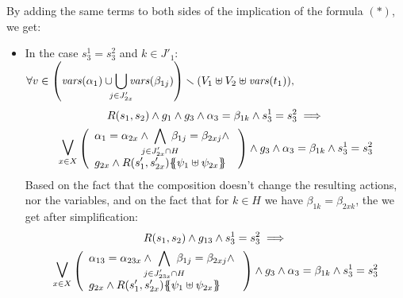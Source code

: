 \documentclass[runningheads]{llncs}
\begin{document}
\begin{enumerate}
\smallskip

By adding the same terms to both sides of the implication of the  formula $(*)$, we get:

\begin{itemize}
\item In the case $ s^1_3=s^2_3$ and $k \in J'_1$:\\
$\displaystyle {\forall v \in {\left(\mathit{vars}{\left(\alpha_{1}\right)}  \cup\!\!\! \bigcup_{j \in J'_{2x}} \!\!\!\mathit{vars}{\left(\beta_{1j} \right)} \right)} \smallsetminus{\left(V_1 \uplus  V_2 \uplus \mathit{vars}{\left(t_1\right)}\right)}},$
\begin{multline*}
R\mpar{s_1, s_{2}} \wedge g_1 \wedge g_3 \wedge \alpha_3=\beta_{1k} \wedge s^1_3=s^2_3\implies\\ \operatorname*{\bigsymb{\bigvee}}_{x \in X} \mpar{\everymath{\displaystyle}
\begin{array}{l}
			\alpha_1 = \alpha_{2x} \wedge \bigwedge_\subbox{j \in J'_{2x} \cap H} \beta_{1j} = \beta_{2xj} \nwedge\\
			 g_{2x} \wedge R\mpar{s'_1, s'_{2x}}\psubst{\psi_1 \uplus \psi_{2x}}
		\end{array}}  \wedge g_3 \wedge \alpha_3=\beta_{1k} \wedge s^1_3=s^2_3
\end{multline*}	
Based on the fact that the composition doesn't change the resulting actions, nor the variables, and on the fact that for $k \in H$ we have $\beta_{1k}=\beta_{2xk}$, the we get after simplification:
\begin{multline*}
R\mpar{s_1, s_{2}} \wedge g_{13} \wedge s^1_3=s^2_3\implies\\ \operatorname*{\bigsymb{\bigvee}}_{x \in X} \mpar{\everymath{\displaystyle}
\begin{array}{l}
			\alpha_{13} = \alpha_{23x} \wedge \bigwedge_\subbox{j \in J'_{23x} \cap H} \beta_{1j} = \beta_{2xj} \nwedge\\
			 g_{2x} \wedge R\mpar{s'_1, s'_{2x}}\psubst{\psi_1 \uplus \psi_{2x}}
		\end{array}}  \wedge g_3 \wedge \alpha_3=\beta_{1k} \wedge s^1_3=s^2_3
\end{multline*}	



\end{itemize}
\end{enumerate}
\end{document}
